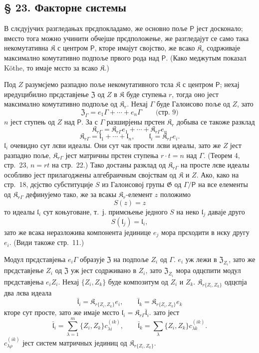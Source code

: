 \documentclass[11pt]{article}
\newcommand{\foreign}[1]{#1}
\begin{document}
\subsection*{§ 23. Факторне системы}\label{faktorensysteme}

В слєдујучих разгледањах прєдпокладамо, же основно поље \(\mathsf P\) јест досконало; вмєсто тога можно учинити обчејше прєдположење, же разгледајут се само така некомутативна \(\mathfrak K\) с центром \(\mathsf P\), кторе имајут својство, же всако \(\mathfrak K_r\) содрживаје максимално комутативно подпоље првого рода над \(\mathsf P\). (Како меджутым показал \foreign{Köthe}, то имаје мєсто за всако \(\mathfrak K\).)

Под \(Z\) разумєјемо разпадно поље некомутативного тєла \(\mathfrak K\) с центром \(\mathsf P\); нехај иредуцибилно прєдставјење \(\mathfrak Z\) од \(Z\) в \(\mathfrak K\) буде ступења \(r\), тогда оно јест максимално комутативно подпоље од \(\mathfrak K_r\). Нехај \(\Gamma\) буде Галоисово поље од \(Z\), зато
\[
\mathfrak Z_\Gamma=e_1\Gamma+\cdots+e_n\Gamma
\qquad\text{(стр.~9)}
\]
\(n\) јест ступењ од \(Z\) над \(\mathsf P\). За с \(\Gamma\) разширјены прстен \(\mathfrak K_r\) добыва се такоже разклад
\[
\mathfrak K_{r\Gamma}=\mathfrak K_{r\Gamma}e_1+\cdots+\mathfrak K_{r\Gamma}e_n
\]
\[
\mathfrak K_{r\Gamma}=\mathfrak l_1+\cdots+\mathfrak l_n,\qquad
\mathfrak l_i=\mathfrak K_{r\Gamma}e_i.
\]
\(\mathfrak l_i\) очевидно сут лєви идеалы. Они сут чак прости лєви идеалы, зато же \(Z\) јест разпадно поље, \(\mathfrak K_{r\Gamma}\) јест матричны прстен ступења \(r\cdot t=n\) над \(\Gamma\). (Теорем 4, стр.~23, \(n=rt\) на стр.~22.) Тако достаны разклад од \(\mathfrak K_{r\Gamma}\) на просте лєве идеалы особливо јест прилагоджены алгебраичным својствам од \(\mathfrak K\) и \(Z\). Ако, како на стр.~18, дєјство субституције \(S\) из Галоисовој групы \(\mathfrak G\) од \(\Gamma/\mathsf P\) на все елементы од \(\mathfrak K_{r\Gamma}\) дефинујемо тако, же за всакы \(\mathfrak K_r\)-елемент \(z\) положимо
\[
S(z)=z
\]
то идеалы \(\mathfrak l_i\) сут коњуговане, т.~ј. примєњење једного \(S\) на неко \(\mathfrak l_j\) даваје друго
\[
S(\mathfrak l_j)=\mathfrak l_i,
\]
зато же всака неразложива компонента јединице \(e_j\) мора прєходити в нєку другу \(e_i\). (Види такоже стр.~11.)

Модул прєдставјења \(e_i\Gamma\) образује \(\mathfrak Z\) на подпоље \(Z_i\) од \(\Gamma\). \(e_i\) уж лежи в \(\mathfrak Z_{Z_i}\), зато же прєдставјење \(Z_i\) од \(\mathfrak Z\) уж јест содрживано в \(Z_i\), зато \(\mathfrak Z_{Z_i}\) мора одцєпити модул прєдставјења \(e_iZ_i\). Нехај \(\{Z_i,Z_k\}\) буде композитум од \(Z_i\) и \(Z_k\). \(\mathfrak K_{r\{Z_i,Z_k\}}\) одцєпја два лєва идеала
\[
\bar{\mathfrak l}_i=\mathfrak K_{r\{Z_i,Z_k\}}e_i,\qquad
\bar{\mathfrak l}_k=\mathfrak K_{r\{Z_i,Z_k\}}e_k
\]
кторе сут просте, зато же имаје мєсто \(\mathfrak l_i=\mathfrak K_{r\Gamma}\bar{\mathfrak l}_i\). зато јест
\[
\bar{\mathfrak l}_i=\sum_{\lambda=1}^m\{Z_i,Z_k\}c_{\lambda i}^{(ik)},\qquad
\bar{\mathfrak l}_k=\sum_{\lambda}\{Z_i,Z_k\}c_{\lambda k}^{(ik)}.
\]
\(c_{\lambda\rho}^{(ik)}\) јест систем матричных јединиц од \(\mathfrak K_{r\{Z_i,Z_k\}}\).
\end{document}
